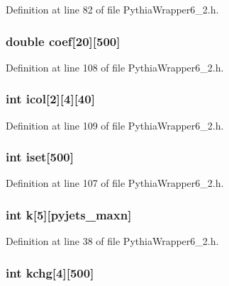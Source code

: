 Definition at line 82 of file Pythia\-Wrapper6\_\-2.h.
\subsubsection{\setlength{\rightskip}{0pt plus 5cm}double {\bf coef}[20][500]}\label{PythiaWrapper6__2_8h_4c37258186538cbae3a8e0d19c4bf9ca}




Definition at line 108 of file Pythia\-Wrapper6\_\-2.h.
\subsubsection{\setlength{\rightskip}{0pt plus 5cm}int {\bf icol}[2][4][40]}\label{PythiaWrapper6__2_8h_480809e7cedee395e1215a812b1d1003}




Definition at line 109 of file Pythia\-Wrapper6\_\-2.h.
\subsubsection{\setlength{\rightskip}{0pt plus 5cm}int {\bf iset}[500]}\label{PythiaWrapper6__2_8h_0542396ef721435b4813e679952115f2}




Definition at line 107 of file Pythia\-Wrapper6\_\-2.h.
\subsubsection{\setlength{\rightskip}{0pt plus 5cm}int {\bf k}[5][{\bf pyjets\_\-maxn}]}\label{PythiaWrapper6__2_8h_93d2c477252003afeb74ae6ca06fc2ec}




Definition at line 38 of file Pythia\-Wrapper6\_\-2.h.
\subsubsection{\setlength{\rightskip}{0pt plus 5cm}int {\bf kchg}[4][500]}\label{PythiaWrapper6__2_8h_88a7d616ffc6c46cccd0763fd6263b0c}




